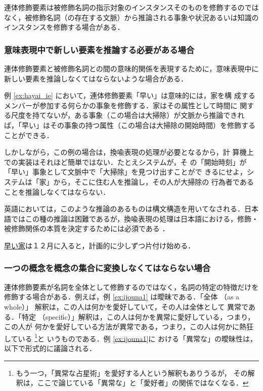 連体修飾要素は被修飾名詞の指示対象のインスタンスそのものを修飾するのでは
なく，被修飾名詞（の存在する文脈）から推論される事象や状況あるいは知識の
インスタンスを修飾する場合がある．

\subsubsection{意味表現中で新しい要素を推論する必要がある場合 }

連体修飾要素と被修飾名詞との間の意味的関係を表現するために，意味表現中に
新しい要素を推論しなくてはならないような場合がある． 

例 \ref{ex:hayai_ie} において，連体修飾要素「早い」は意味的には，家を構
成するメンバーが参加する何らかの事象を修飾する．家はその属性として時間に
関する尺度を持てないが，ある事象（この場合は大掃除）が文脈から推論できれ
ば，「早い」はその事象の持つ属性（この場合は大掃除の開始時間）を修飾する
ことができる．  

しかしながら，この例の場合は，換喩表現の処理が必要となるから，計
算機上での実装はそれほど簡単ではない．たとえシステムが，そ
の「開始時刻」が「早い」事象として文脈中で「大掃除」を見つけ出すことがで
きるにせよ，システムは「家」から，そこに住む人を推論し，その人が大掃除の
行為者であることを推論しなくてはならない．

英語においては，このような推論のあるものは構文構造を用いてなされる．日本
語ではこの種の推論は困難であるが，換喩表現の処理は日本語における，修飾・
被修飾関係の本質を決定するためには必須である \cite{matsumoto93j}．

\begin{exx}\rm
  \label{ex:hayai_ie}
  \hspace*{.5cm} 
  \underline{早い家}は１２月に入ると，計画的に少しずつ片付け始める．
  \begin{center}
  \end{center}
\end{exx}

\subsubsection{一つの概念を概念の集合に変換しなくてはならない場合}

連体修飾要素が名詞を全体として修飾するのではなく，名詞の特定の特徴だけを
修飾する場合がある．例えば，例 \ref{ex:ijouna1} は曖昧である．「全体 
（as a whole）」 解釈は，この人は何かを愛好していて，その人は全体として
異常である．「特定
（specific）」解釈は，この人は何かを異常に愛好している，つまり，この人が
何かを愛好している方法が異常である，つまり，この人は何かに熱狂している
\footnote{もう一つ，「異常な占星術」を愛好する人という解釈もありうるが，
その解釈は，ここで論じている「異常な」と「愛好者」の関係ではなくなる．}と
いうものである．例 \ref{ex:ijouna1}に
おける「異常な」の曖昧性は，以下で形式的に議論される． 

